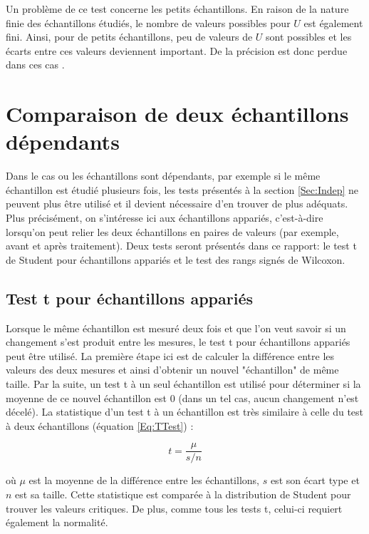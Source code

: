 \documentclass{article}       %
\begin{document}
Un problème de ce test concerne les petits échantillons. En raison de la nature finie des échantillons étudiés, le nombre de valeurs possibles pour $U$ est également fini. Ainsi, pour de petits échantillons, peu de valeurs de $U$ sont possibles et les écarts entre ces valeurs deviennent important. De la précision est donc perdue dans ces cas \cite{NonParam}.





\section{Comparaison de deux échantillons dépendants}

Dans le cas ou les échantillons sont dépendants, par exemple si le même échantillon est étudié plusieurs fois, les tests présentés à la section \ref{Sec:Indep} ne peuvent plus être utilisé et il devient nécessaire d'en trouver de plus adéquats. Plus précisément, on s'intéresse ici aux échantillons appariés, c'est-à-dire lorsqu'on peut relier les deux échantillons en paires de valeurs (par exemple, avant et après traitement). Deux tests seront présentés dans ce rapport: le test t de Student pour échantillons appariés et le test des rangs signés de Wilcoxon.

\subsection{Test t pour échantillons appariés}
\label{Sec:TApp}

Lorsque le même échantillon est mesuré deux fois et que l'on veut savoir si un changement s'est produit entre les mesures, le test t pour échantillons appariés peut être utilisé. La première étape ici est de calculer la différence entre les valeurs des deux mesures et ainsi d'obtenir un nouvel "échantillon" de même taille. Par la suite, un test t à un seul échantillon est utilisé pour déterminer si la moyenne de ce nouvel échantillon est 0 (dans un tel cas, aucun changement n'est décelé). La statistique d'un test t à un échantillon est très similaire à celle du test à deux échantillons (équation \ref{Eq:TTest}) \cite{PTT}:

\begin{equation*}
    t = \frac{\mu}{s/n}
\end{equation*}

où $\mu$ est la moyenne de la différence entre les échantillons, $s$ est son écart type et $n$ est sa taille. Cette statistique est comparée à la distribution de Student pour trouver les valeurs critiques. De plus, comme tous les tests t, celui-ci requiert également la normalité.
\end{document}
